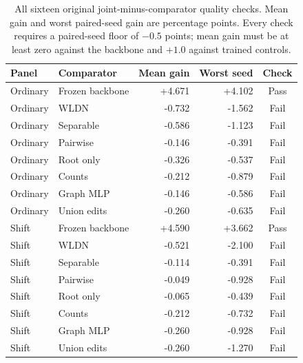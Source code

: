 \begin{table}[ht]
\centering\small
\caption{All sixteen original joint-minus-comparator quality checks.
Mean gain and worst paired-seed gain are percentage points. Every
check requires a paired-seed floor of $-0.5$ points; mean gain must
be at least zero against the backbone and $+1.0$ against trained controls.}
\label{tab:pin-quality-v3-checks}
\begin{tabular}{llrrc}
\toprule
Panel & Comparator & Mean gain & Worst seed & Check \\
\midrule
Ordinary & Frozen backbone & +4.671 & +4.102 & Pass \\
Ordinary & WLDN & -0.732 & -1.562 & Fail \\
Ordinary & Separable & -0.586 & -1.123 & Fail \\
Ordinary & Pairwise & -0.146 & -0.391 & Fail \\
Ordinary & Root only & -0.326 & -0.537 & Fail \\
Ordinary & Counts & -0.212 & -0.879 & Fail \\
Ordinary & Graph MLP & -0.146 & -0.586 & Fail \\
Ordinary & Union edits & -0.260 & -0.635 & Fail \\
Shift & Frozen backbone & +4.590 & +3.662 & Pass \\
Shift & WLDN & -0.521 & -2.100 & Fail \\
Shift & Separable & -0.114 & -0.391 & Fail \\
Shift & Pairwise & -0.049 & -0.928 & Fail \\
Shift & Root only & -0.065 & -0.439 & Fail \\
Shift & Counts & -0.212 & -0.732 & Fail \\
Shift & Graph MLP & -0.260 & -0.928 & Fail \\
Shift & Union edits & -0.260 & -1.270 & Fail \\
\bottomrule
\end{tabular}
\end{table}
